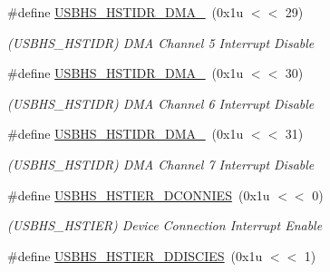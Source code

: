 \begin{DoxyCompactItemize}
\mbox{\label{group__SAMV71__USBHS_ga11082945215e5922c3f667372e20d570}} 
\#define \mbox{\hyperlink{group__SAMV71__USBHS_ga11082945215e5922c3f667372e20d570}{U\+S\+B\+H\+S\+\_\+\+H\+S\+T\+I\+D\+R\+\_\+\+D\+M\+A\+\_}}~(0x1u $<$$<$ 29)
\begin{DoxyCompactList}\small\item\em (U\+S\+B\+H\+S\+\_\+\+H\+S\+T\+I\+DR) D\+MA Channel 5 Interrupt Disable \end{DoxyCompactList}\item 
\mbox{\label{group__SAMV71__USBHS_gaf14eb02f7bd49e644a2436e86c3c5e97}} 
\#define \mbox{\hyperlink{group__SAMV71__USBHS_gaf14eb02f7bd49e644a2436e86c3c5e97}{U\+S\+B\+H\+S\+\_\+\+H\+S\+T\+I\+D\+R\+\_\+\+D\+M\+A\+\_}}~(0x1u $<$$<$ 30)
\begin{DoxyCompactList}\small\item\em (U\+S\+B\+H\+S\+\_\+\+H\+S\+T\+I\+DR) D\+MA Channel 6 Interrupt Disable \end{DoxyCompactList}\item 
\mbox{\label{group__SAMV71__USBHS_ga4c3e5f19e87931dbac7660d1ef1a7017}} 
\#define \mbox{\hyperlink{group__SAMV71__USBHS_ga4c3e5f19e87931dbac7660d1ef1a7017}{U\+S\+B\+H\+S\+\_\+\+H\+S\+T\+I\+D\+R\+\_\+\+D\+M\+A\+\_}}~(0x1u $<$$<$ 31)
\begin{DoxyCompactList}\small\item\em (U\+S\+B\+H\+S\+\_\+\+H\+S\+T\+I\+DR) D\+MA Channel 7 Interrupt Disable \end{DoxyCompactList}\item 
\mbox{\label{group__SAMV71__USBHS_ga09be10f559e69bb67edafc93a6585788}} 
\#define \mbox{\hyperlink{group__SAMV71__USBHS_ga09be10f559e69bb67edafc93a6585788}{U\+S\+B\+H\+S\+\_\+\+H\+S\+T\+I\+E\+R\+\_\+\+D\+C\+O\+N\+N\+I\+ES}}~(0x1u $<$$<$ 0)
\begin{DoxyCompactList}\small\item\em (U\+S\+B\+H\+S\+\_\+\+H\+S\+T\+I\+ER) Device Connection Interrupt Enable \end{DoxyCompactList}\item 
\mbox{\label{group__SAMV71__USBHS_ga20152f5f9facf06b69f6b83fba5f6cfd}} 
\#define \mbox{\hyperlink{group__SAMV71__USBHS_ga20152f5f9facf06b69f6b83fba5f6cfd}{U\+S\+B\+H\+S\+\_\+\+H\+S\+T\+I\+E\+R\+\_\+\+D\+D\+I\+S\+C\+I\+ES}}~(0x1u $<$$<$ 1)
$$
\end{DoxyCompactItemize}
